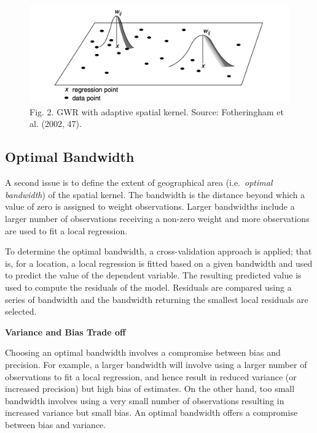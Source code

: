 \documentclass[
  letterpaper,
  DIV=11,
  numbers=noendperiod,
  oneside]{scrreprt}
\begin{document}
\begin{figure}[H]

{\centering \includegraphics{figs/ch8/adaptive_bandwidth.png}

}

\caption{Fig. 2. GWR with adaptive spatial kernel. Source: Fotheringham
et al. (2002, 47).}

\end{figure}%

\subsection{Optimal Bandwidth}\label{optimal-bandwidth}

A second issue is to define the extent of geographical area
(i.e.~\emph{optimal bandwidth}) of the spatial kernel. The bandwidth is
the distance beyond which a value of zero is assigned to weight
observations. Larger bandwidths include a larger number of observations
receiving a non-zero weight and more observations are used to fit a
local regression.

To determine the optimal bandwidth, a cross-validation approach is
applied; that is, for a location, a local regression is fitted based on
a given bandwidth and used to predict the value of the dependent
variable. The resulting predicted value is used to compute the residuals
of the model. Residuals are compared using a series of bandwidth and the
bandwidth returning the smallest local residuals are selected.

\textbf{Variance and Bias Trade off}

Choosing an optimal bandwidth involves a compromise between bias and
precision. For example, a larger bandwidth will involve using a larger
number of observations to fit a local regression, and hence result in
reduced variance (or increased precision) but high bias of estimates. On
the other hand, too small bandwidth involves using a very small number
of observations resulting in increased variance but small bias. An
optimal bandwidth offers a compromise between bias and variance.
\end{document}
